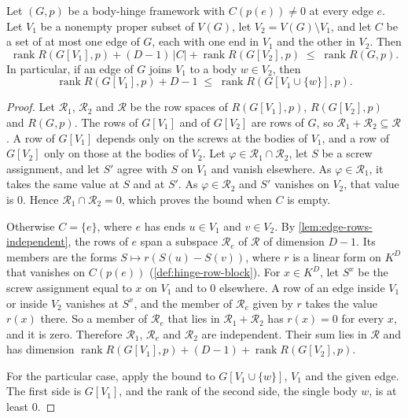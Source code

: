 \begin{lemma}
  \label{lem:block-rank-cut}
  \leanok
  Let $(G,p)$ be a body-hinge framework with $C(p(e)) \neq 0$ at every
  edge $e$. Let $V_1$ be a nonempty proper subset of $V(G)$, let
  $V_2 = V(G) \setminus V_1$, and let $C$ be a set of at most one edge
  of $G$, each with one end in $V_1$ and the other in $V_2$. Then
  \[
    \operatorname{rank} R(G[V_1],p) + (D-1)\,|C|
    + \operatorname{rank} R(G[V_2],p)
    \;\le\;
    \operatorname{rank} R(G,p).
  \]
  In particular, if an edge of $G$ joins $V_1$ to a body $w \in V_2$,
  then
  \[
    \operatorname{rank} R(G[V_1],p) + D - 1 \;\le\;
    \operatorname{rank} R(G[V_1 \cup \{w\}],p).
  \]
\end{lemma}
\begin{proof}
  \leanok
  Let $\mathcal R_1$, $\mathcal R_2$ and $\mathcal R$ be the row spaces of
  $R(G[V_1],p)$, $R(G[V_2],p)$ and $R(G,p)$. The rows of $G[V_1]$ and of
  $G[V_2]$ are rows of $G$, so $\mathcal R_1 + \mathcal R_2 \subseteq
  \mathcal R$. A row of $G[V_1]$ depends only on the screws at the bodies
  of $V_1$, and a row of $G[V_2]$ only on those at the bodies of $V_2$.
  Let $\varphi \in \mathcal R_1 \cap \mathcal R_2$, let $S$ be a screw
  assignment, and let $S'$ agree with $S$ on $V_1$ and vanish elsewhere.
  As $\varphi \in \mathcal R_1$, it takes the same value at $S$ and at
  $S'$. As $\varphi \in \mathcal R_2$ and $S'$ vanishes on $V_2$, that
  value is $0$. Hence $\mathcal R_1 \cap \mathcal R_2 = 0$, which proves
  the bound when $C$ is empty.

  Otherwise $C = \{e\}$, where $e$ has ends $u \in V_1$ and $v \in V_2$.
  By \cref{lem:edge-rows-independent}, the rows of $e$ span a
  subspace $\mathcal R_e$ of $\mathcal R$ of dimension $D - 1$. Its
  members are the forms $S \mapsto r(S(u) - S(v))$, where
  $r$ is a linear form on $K^D$ that vanishes on $C(p(e))$
  (\cref{def:hinge-row-block}). For $x \in K^D$, let $S^x$ be the screw
  assignment equal to $x$ on $V_1$ and to $0$ elsewhere. A row of an edge
  inside $V_1$ or inside $V_2$ vanishes at $S^x$, and the member of
  $\mathcal R_e$ given by $r$ takes the value $r(x)$ there. So a member
  of $\mathcal R_e$ that lies in $\mathcal R_1 + \mathcal R_2$ has
  $r(x) = 0$ for every $x$, and it is zero. Therefore $\mathcal R_1$,
  $\mathcal R_e$ and $\mathcal R_2$ are independent. Their sum lies in
  $\mathcal R$ and has dimension
  $\operatorname{rank} R(G[V_1],p) + (D - 1) + \operatorname{rank}
  R(G[V_2],p)$.

  For the particular case, apply the bound to $G[V_1 \cup \{w\}]$,
  $V_1$ and the given edge. The first side is $G[V_1]$, and the rank of
  the second side, the single body $w$, is at least $0$.
\end{proof}

